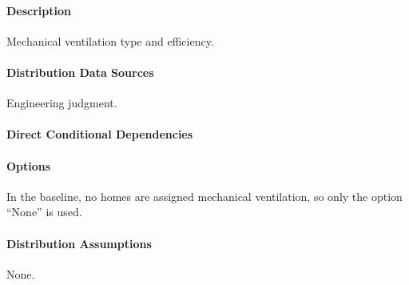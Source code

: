 \paragraph{Description}
% 
Mechanical ventilation type and efficiency.

\paragraph{Distribution Data Sources}
% 
Engineering judgment.

\paragraph{Direct Conditional Dependencies}


\paragraph{Options}
In the baseline, no homes are assigned mechanical ventilation, so only the option ``None'' is used.

\paragraph{Distribution Assumptions}
% 
None.
